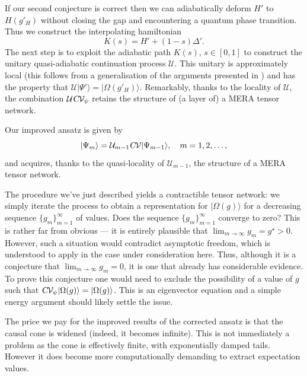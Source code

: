 \documentclass[twocolumn,lengthcheck,superscriptaddress]{revtex4-1}
\theoremstyle{definition}
\theoremstyle{remark}
\begin{document}
If our second conjecture is correct then we can adiabatically deform $H'$ to $H(g'_H)$ without closing the gap and encountering a quantum phase transition. Thus we construct the interpolating hamiltonian 
\begin{equation}
	K(s) = H' + (1-s)\Delta'.
\end{equation}
The next step is to exploit the adiabatic path $K(s)$, $s\in [0, 1]$ to construct the unitary quasi-adiabatic continuation process $\mathcal{U}$. This unitary is approximately local (this follows from a generalisation of the arguments presented in \cite{osborne:2005d}) and has the property that $\mathcal{U}|\Psi'\rangle = |\Omega(g'_H)\rangle$.  Remarkably, thanks to the locality of $\mathcal{U}$, the combination $\mathcal{U}\textsl{C}\mathcal{V}_{\psi}$ retains the structure of (a layer of) a MERA tensor network.

Our improved ansatz is given by
\begin{equation}\label{eq:imprvansatz}
	|\Psi_m\rangle = \mathcal{U}_{m-1}\textsl{C}\mathcal{V}|\Psi_{m-1}\rangle, \quad m = 1, 2, \ldots,
\end{equation}
and acquires, thanks to the quasi-locality of $\mathcal{U}_{m-1}$, the structure of a MERA tensor network.

The procedure we've just described yields a contractible tensor network: we simply iterate the process to obtain a representation for $|\Omega(g)\rangle$ for a decreasing sequence $\{g_m\}_{m=1}^\infty$ of values. Does the sequence $\{g_m\}_{m=1}^\infty$ converge to zero? This is rather far from obvious --- it is entirely plausible that $\lim_{m\rightarrow \infty} g_m = g^\star >0$. However, such a situation would  contradict asymptotic freedom, which is understood to apply in the case under consideration here. Thus, although it is a conjecture that $\lim_{m\rightarrow \infty} g_m = 0$, it is one that already has considerable evidence. To prove this conjecture one would need to exclude the possibility of a value of $g$ such that $\textsl{C}\mathcal{V}_{\psi}|\Omega(g)\rangle = |\Omega(g)\rangle$. This is an eigenvector equation and a simple energy argument should likely settle the issue. 

The price we pay for the improved results of the corrected ansatz is that the causal cone is widened (indeed, it becomes infinite). This is not immediately a problem as the cone is effectively finite, with exponentially damped tails. However it does become more computationally demanding to extract expectation values.
\end{document}
